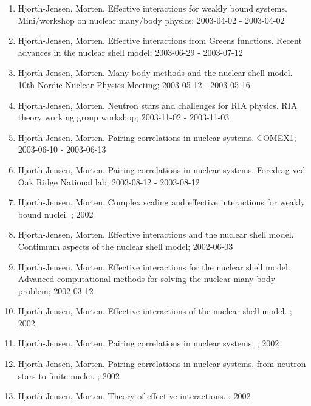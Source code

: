 \documentclass[%
oneside,                 %
final,                   %
10pt]{article}
\begin{document}
\begin{enumerate}
\item Hjorth-Jensen, Morten. Effective interactions for weakly bound systems. Mini/workshop on nuclear many/body physics; 2003-04-02 - 2003-04-02

\item Hjorth-Jensen, Morten. Effective interactions from Greens functions. Recent advances in the nuclear shell model; 2003-06-29 - 2003-07-12

\item Hjorth-Jensen, Morten. Many-body methods and the nuclear shell-model. 10th Nordic Nuclear Physics Meeting; 2003-05-12 - 2003-05-16

\item Hjorth-Jensen, Morten. Neutron stars and challenges for RIA physics. RIA theory working group workshop; 2003-11-02 - 2003-11-03

\item Hjorth-Jensen, Morten. Pairing correlations in nuclear systems. COMEX1; 2003-06-10 - 2003-06-13

\item Hjorth-Jensen, Morten. Pairing correlations in nuclear systems. Foredrag ved Oak Ridge National lab; 2003-08-12 - 2003-08-12

\item Hjorth-Jensen, Morten. Complex scaling and effective interactions for weakly bound nuclei. ; 2002

\item Hjorth-Jensen, Morten. Effective interactions and the nuclear shell model. Continuum aspects of the nuclear shell model; 2002-06-03

\item Hjorth-Jensen, Morten. Effective interactions for the nuclear shell model. Advanced computational methods for solving the nuclear many-body problem; 2002-03-12

\item Hjorth-Jensen, Morten. Effective interactions of the nuclear shell model. ; 2002

\item Hjorth-Jensen, Morten. Pairing correlations in nuclear systems. ; 2002

\item Hjorth-Jensen, Morten. Pairing correlations in nuclear systems, from neutron stars to finite nuclei. ; 2002

\item Hjorth-Jensen, Morten. Theory of effective interactions. ; 2002


\end{enumerate}
\end{document}
